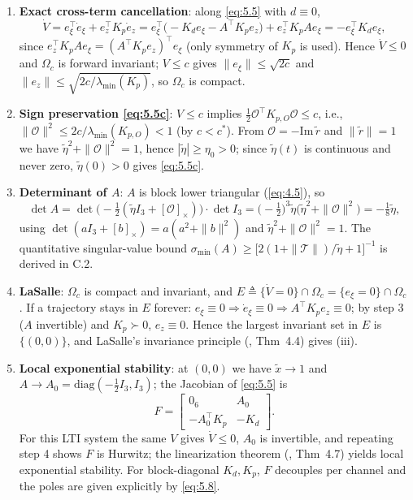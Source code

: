 \begin{enumerate}[leftmargin=2em]
  \item \textbf{Exact cross-term cancellation}: along \eqref{eq:5.5} with $d\equiv0$,
  \begin{equation*}
  \dot V=e_\xi^\top\dot e_\xi+e_z^\top K_p\dot e_z
  =e_\xi^\top\bigl(-K_de_\xi-A^\top K_pe_z\bigr)+e_z^\top K_pAe_\xi
  =-e_\xi^\top K_de_\xi ,
  \end{equation*}
  since $e_z^\top K_pAe_\xi=(A^\top K_pe_z)^\top e_\xi$ (only symmetry of $K_p$ is used). Hence $\dot V\le0$ and $\Omega_c$ is forward invariant; $V\le c$ gives $\|e_\xi\|\le\sqrt{2c}$ and $\|e_z\|\le\sqrt{2c/\lambda_{\min}(K_p)}$, so $\Omega_c$ is compact.

  \item \textbf{Sign preservation \eqref{eq:5.5c}}: $V\le c$ implies $\tfrac12\mathcal O^\top K_{p,O}\mathcal O\le c$, i.e., $\|\mathcal O\|^2\le2c/\lambda_{\min}(K_{p,O})<1$ (by $c<c^{*}$). From $\mathcal O=-\mathrm{Im}\,\tilde r$ and $\|\tilde r\|=1$ we have $\tilde\eta^2+\|\mathcal O\|^2=1$, hence $|\tilde\eta|\ge\eta_0>0$; since $\tilde\eta(t)$ is continuous and never zero, $\tilde\eta(0)>0$ gives \eqref{eq:5.5c}.

  \item \textbf{Determinant of $A$}: $A$ is block lower triangular (\eqref{eq:4.5}), so
  \begin{equation*}
  \det A=\det\bigl(-\tfrac12(\tilde\eta I_3+[\mathcal O]_\times)\bigr)\cdot\det I_3
  =\bigl(-\tfrac12\bigr)^3\tilde\eta\bigl(\tilde\eta^2+\|\mathcal O\|^2\bigr)=-\tfrac18\tilde\eta ,
  \end{equation*}
  using $\det(aI_3+[b]_\times)=a(a^2+\|b\|^2)$ and $\tilde\eta^2+\|\mathcal O\|^2=1$. The quantitative singular-value bound $\sigma_{\min}(A)\ge\bigl[2(1+\|\mathcal T\|)/\tilde\eta+1\bigr]^{-1}$ is derived in C.2.

  \item \textbf{LaSalle}: $\Omega_c$ is compact and invariant, and $E\triangleq\{\dot V=0\}\cap\Omega_c=\{e_\xi=0\}\cap\Omega_c$. If a trajectory stays in $E$ forever: $e_\xi\equiv0\Rightarrow\dot e_\xi\equiv0\Rightarrow A^\top K_pe_z\equiv0$; by step 3 ($A$ invertible) and $K_p\succ0$, $e_z\equiv0$. Hence the largest invariant set in $E$ is $\{(0,0)\}$, and LaSalle's invariance principle (\cite{Kha02}, Thm~4.4) gives (iii).

  \item \textbf{Local exponential stability}: at $(0,0)$ we have $\tilde x\to1$ and $A\to A_0=\mathrm{diag}(-\tfrac12I_3,I_3)$; the Jacobian of \eqref{eq:5.5} is
  \begin{equation*}
  F=\begin{bmatrix}0_6 & A_0\\ -A_0^\top K_p & -K_d\end{bmatrix}.
  \end{equation*}
  For this LTI system the same $V$ gives $\dot V\le0$, $A_0$ is invertible, and repeating step 4 shows $F$ is Hurwitz; the linearization theorem (\cite{Kha02}, Thm~4.7) yields local exponential stability. For block-diagonal $K_d,K_p$, $F$ decouples per channel and the poles are given explicitly by \eqref{eq:5.8}.
\end{enumerate}

